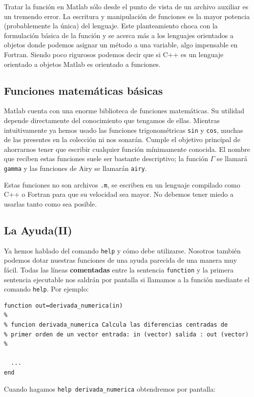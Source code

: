 Tratar la función en Matlab sólo desde el punto de vista de un archivo
auxiliar es un tremendo error. La escritura y manipulación de
funciones es la mayor potencia (probablemente la única) del lenguaje.
Este planteamiento choca con la formulación básica de la función y se
acerca más a los lenguajes orientados a objetos donde podemos asignar
un método a una variable, algo impensable en Fortran. Siendo poco
rigurosos podemos decir que si C++ es un lenguaje orientado a objetos
Matlab es orientado a funciones.


\subsection{Funciones matemáticas básicas}

Matlab cuenta con una enorme biblioteca de funciones matemáticas.  Su
utilidad depende directamente del conocimiento que tengamos de ellas.
Mientras intuitivamente ya hemos usado las funciones trigonométricas
\texttt{sin} y \texttt{cos}, muchas de las presentes en la colección
ni nos sonarán. Cumple el objetivo principal de ahorrarnos tener que
escribir cualquier función mínimamente conocida. El nombre que reciben
estas funciones suele ser bastante descriptivo; la función $\Gamma$ se
llamará \texttt{gamma} y las funciones de Airy se llamarán
\texttt{airy}.

Estas funciones no son archivos \texttt{.m}, se escriben en un
lenguaje compilado como C++ o Fortran para que su velocidad sea mayor.
No debemos tener miedo a usarlas tanto como sea posible.


\subsection{La Ayuda(II)}

Ya hemos hablado del comando \texttt{help} y cómo debe
utilizarse. Nosotros también podemos dotar nuestras funciones de una
ayuda parecida de una manera muy fácil. Todas las líneas
\textbf{comentadas} entre la sentencia \texttt{function} y la primera
sentencia ejecutable nos saldrán por pantalla si llamamos a la función
mediante el comando \texttt{help}. Por ejemplo:

\begin{lstlisting}
function out=derivada_numerica(in)   
%   
% funcion derivada_numerica Calcula las diferencias centradas de
% primer orden de un vector entrada: in (vector) salida : out (vector)
%
   
  ...   
end 
\end{lstlisting}
Cuando hagamos \texttt{help derivada\_numerica} obtendremos por
pantalla:

